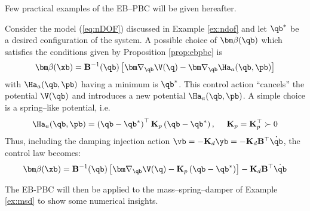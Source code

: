 %
Few practical examples of the EB--PBC will be given hereafter.
%
\begin{exmp}
    Consider the model (\ref{eq:nDOF}) discussed in Example \ref{ex:ndof} and let $\qb^*$ be a desired configuration of the system. A possible choice of $\bm\beta(\qb)$ which satisfies the conditions given by Proposition \ref{prop:ebpbc} is
    \begin{equation}
        \bm\beta(\xb) = \mathbf{B}^{-1}(\qb)\left[\bm\nabla_{\qb}\V(\q) - \bm\nabla_\qb\Ha_a(\qb,\pb)\right]
    \end{equation}
    with $\Ha_a(\qb,\pb)$ having a minimum is $\qb^*$. This control action ``cancels'' the potential $\V(\qb)$ and introduces a new potential $\Ha_a(\qb,\pb)$. A simple choice is a spring--like potential, i.e.
    \begin{equation}
        \Ha_a(\qb,\pb) = \left(\qb-\qb^*\right)^\top\mathbf{K}_p\left(\qb-\qb^*\right),~~~~\mathbf{K}_p = \mathbf{K}_p^\top\succ 0
    \end{equation}
    Thus, including the damping injection action $\vb = -\mathbf{K}_d\yb =-\mathbf{K}_d\mathbf{B}^\top\dot{\qb}$, the control law becomes:
    \begin{equation}
        \bm\beta(\xb) = \mathbf{B}^{-1}(\qb)\left[\bm\nabla_{\qb}\V(\q) - \mathbf{K}_p\left(\qb-\qb^*\right)\right] - \mathbf{K}_d\mathbf{B}^\top\dot{\qb}
    \end{equation}
\end{exmp}
%
The EB-PBC will then be applied to the mass--spring--damper of Example \ref{ex:msd} to show some numerical insights. 
%
